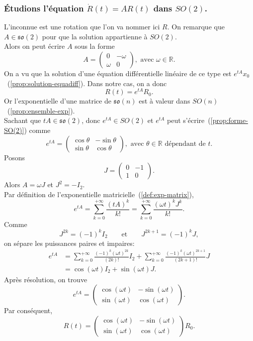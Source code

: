 \documentclass[12pt]{report}
\begin{document}
\subsubsection{Étudions l'équation $\dot{R}(t)=AR(t)$ dans $SO(2)$.}
L'inconnue est une rotation que l'on va nommer ici $R$. On remarque que $A\in \mathfrak{so}(2)$ pour que la solution appartienne à $SO(2)$.\\
Alors on peut écrire $A$ sous la forme
\[
A=\begin{pmatrix}0 &-\omega \\\omega &0\end{pmatrix}, \text{ avec } \omega\in\mathbb{R}. 
\]
On a vu que la solution d'une équation différentielle linéaire de ce type est $e^{tA}x_0$~(\ref{prop:solution-equadiff}). Dans notre cas, on a donc
\[
R(t)=e^{tA}R_0.
\]
Or l'exponentielle d'une matrice de $\mathfrak{so}(n)$ est à valeur dans $SO(n)$~(\ref{prop:ensemble-exp}).\\
Sachant que $tA\in\mathfrak{so}(2)$, donc $e^{tA}\in SO(2)$ et $e^{tA}$ peut s'écrire~(\ref{prop:forme-SO(2)}) comme
\[
e^{tA}=\begin{pmatrix}\cos\theta &-\sin\theta \\\sin\theta &\cos\theta\end{pmatrix},\text{ avec }\theta\in\mathbb{R}\text{ dépendant de }t.
\]
Posons
\[
J=\begin{pmatrix}0&-1\\1&0\end{pmatrix}.
\]
Alors $A=\omega J$ et $J^2=-I_2$.\\
Par définition de l'exponentielle matricielle~(\ref{def:exp-matrix}),
\[
e^{tA}=\sum_{k=0}^{+\infty}\frac{{(tA)}^k}{k!}=\sum_{k=0}^{+\infty}\frac{{(\omega t)}^{k}J^k}{k!}.
\]
Comme
\[
J^{2k}={(-1)}^{k}I_2\qquad\text{et}\qquad J^{2k+1}={(-1)}^{k}J,
\]
on sépare les puissances paires et impaires:
\[
\begin{aligned}
e^{tA}&=\sum_{k=0}^{+\infty}\frac{{(-1)}^k{(\omega t)}^{2k}}{(2k)!}I_2+\sum_{k=0}^{+\infty}\frac{{(-1)}^k{(\omega t)}^{2k+1}}{(2k+1)!}J\\
&=\cos(\omega t)I_2+\sin(\omega t)J.
\end{aligned}
\]
Après résolution, on trouve
\[
e^{tA}=\begin{pmatrix}\cos(\omega t) &-\sin(\omega t) \\\sin(\omega t) &\cos(\omega t)\end{pmatrix}.
\]
Par conséquent,
\[
R(t)=\begin{pmatrix}\cos(\omega t) & -\sin(\omega t) \\\sin(\omega t) & \cos(\omega t)\end{pmatrix}R_0.
\]
\end{document}

